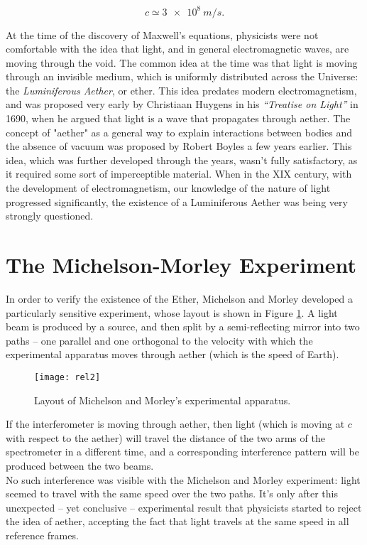 \[c\simeq\SI{3e8}{m/s}.\]

At the time of the discovery of Maxwell's equations, physicists were not comfortable with the idea that light, and in general electromagnetic waves, are moving through the void. The common idea at the time was that light is moving through an invisible medium, which is uniformly distributed across the Universe: the \emph{Luminiferous Aether}, or ether. This idea predates modern electromagnetism, and was proposed very early by Christiaan Huygens in his {\it ``Treatise on Light''} in 1690, when he argued that light is a wave that propagates through aether. The concept of "aether" as a general way to explain interactions between bodies and the absence of vacuum was proposed by Robert Boyles a few years earlier. This idea, which was further developed through the years, wasn't fully satisfactory, as it required some sort of imperceptible material. When in the XIX century, with the development of electromagnetism, our knowledge of the nature of light progressed significantly, the existence of a Luminiferous Aether was being very strongly questioned. \\

\section{The Michelson-Morley Experiment}
In order to verify the existence of the Ether, Michelson and Morley developed a particularly sensitive experiment, whose layout is shown in Figure \ref{fig:rel2}. A light beam is produced by a source, and then split by a semi-reflecting mirror into two paths -- one parallel and one orthogonal to the velocity with which the experimental apparatus moves through aether (which is the speed of Earth).

\begin{figure}
  \centering
  \texttt{[image: rel2]}
\caption{Layout of Michelson and Morley's experimental apparatus.}\label{fig:rel2}
\end{figure}{}

If the interferometer is moving through aether, then light (which is moving at $c$ with respect to the aether) will travel the distance of the two arms of the spectrometer in a different time, and a corresponding interference pattern will be produced between the two beams.\\

No such interference was visible with the Michelson and Morley experiment: light seemed to travel with the same speed over the two paths. It's only after this unexpected -- yet conclusive -- experimental result that physicists started to reject the idea of aether, accepting the fact that light travels at the same speed in all reference frames. \\

